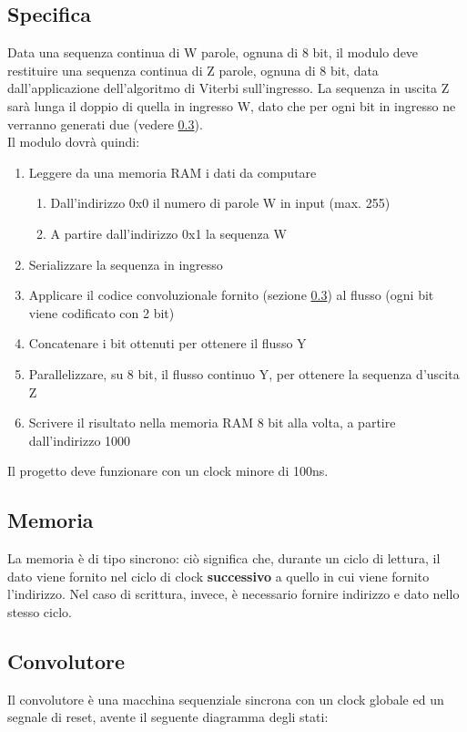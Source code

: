 \documentclass{article}
\begin{document}
\subsection{Specifica}
\label{Specifica}
Data una sequenza continua di W parole, ognuna di 8 bit, il modulo deve restituire una sequenza continua di Z parole, ognuna di 8 bit, data dall'applicazione dell'algoritmo di Viterbi sull'ingresso. La sequenza in uscita Z sarà lunga il doppio di quella in ingresso W, dato che per ogni bit in ingresso ne verranno generati due (vedere \ref{convolutore}).
\\
Il modulo dovrà quindi:
\begin{enumerate}
    \item Leggere da una memoria RAM i dati da computare
    \begin{enumerate}
        \item Dall'indirizzo 0x0 il numero di parole W in input (max. 255)
        \item A partire dall'indirizzo 0x1 la sequenza W
    \end{enumerate}
    \item Serializzare la sequenza in ingresso
    \item Applicare il codice convoluzionale fornito (sezione \ref{convolutore}) al flusso (ogni bit viene codificato con 2 bit)
    \item Concatenare i bit ottenuti per ottenere il flusso Y
    \item Parallelizzare, su 8 bit, il flusso continuo Y, per ottenere la sequenza d'uscita Z
    \item Scrivere il risultato nella memoria RAM 8 bit alla volta, a partire dall'indirizzo 1000
\end{enumerate} 

Il progetto deve funzionare con un clock minore di 100ns.

\subsection{Memoria}
La memoria è di tipo sincrono: ciò significa che, durante un ciclo di lettura, il dato viene fornito nel ciclo di clock \textbf{successivo} a quello in cui viene fornito l'indirizzo. Nel caso di scrittura, invece, è necessario fornire indirizzo e dato nello stesso ciclo.

\newpage

\subsection{Convolutore}
\label{convolutore}
Il convolutore è una macchina sequenziale sincrona con un clock globale ed un segnale di reset, avente il seguente diagramma degli stati:
\end{document}
